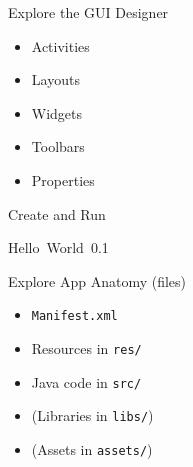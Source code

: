 \documentclass[a4paper,slides=slides,handouts=handouts]{mh-presentation}       %
\begin{document}
	\begin{slide}
		{\Huge Explore the GUI Designer}
		
		\vspace{5mm}
		
		\huge
		\begin{minipage}{5cm}
			\begin{itemize}
			  \item Activities
			  \item Layouts
			  \item Widgets
			  \item Toolbars
			  \item Properties
			\end{itemize}
		\end{minipage}
	\end{slide}
	
	\begin{slide}
		{\Huge Create and Run}
		
		\vspace{3mm}
		
		{\Huge Hello~World~0.1}
	\end{slide}
	
	
	\showPreviousPreviousSlide\showPreviousSlide\showThisSlide
	\vspace{4mm}
	
	\begin{slide}
		{\Huge Explore App Anatomy (files)}
		
		\vspace{5mm}
		
		\huge
		\begin{minipage}{7cm}
			\begin{itemize}
			  \item \verb~Manifest.xml~
			  \item Resources in \verb~res/~
			  \item Java code in \verb~src/~
			  \item (Libraries in \verb~libs/~)
			  \item (Assets in \verb~assets/~)
			\end{itemize}
		\end{minipage}
	\end{slide}
	
\end{document}
